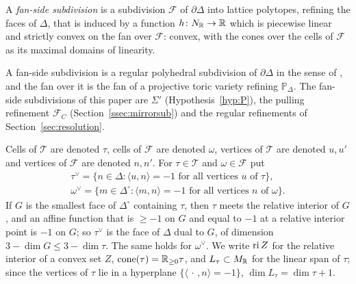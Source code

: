 \begin{definition}\label{def:fanside}
A \emph{fan-side subdivision} is a subdivision $\mathcal F$ of $\partial\Delta$ into lattice polytopes, refining the faces of
$\Delta$, that is induced by a function $h\colon N_\mathbb R\to\mathbb R$ which is piecewise linear and strictly convex on the fan over
$\mathcal F$: convex, with the cones over the cells of $\mathcal F$ as its maximal domains of linearity.
\end{definition}

A fan-side subdivision is a regular polyhedral subdivision of $\partial\Delta$ in the sense of \cite[\S2.3]{DLRS}, and the fan over it
is the fan of a projective toric variety refining $\mathbb P_\Delta$. The fan-side subdivisions of this paper are $\Sigma'$
(Hypothesis~\ref{hyp:P}), the pulling refinement $\mathcal F_C$ (Section~\ref{ssec:mirrorsub}) and the regular
refinements of Section~\ref{sec:resolution}.

Cells of $\mathcal T$ are denoted $\tau$, cells of $\mathcal F$ are denoted $\omega$, vertices of $\mathcal T$ are denoted
$u,u'$ and vertices of $\mathcal F$ are denoted $n,n'$. For $\tau\in\mathcal T$ and $\omega\in\mathcal F$ put
\begin{gather*}
\tau^\vee=\{n\in\Delta:\langle u,n\rangle=-1\text{ for all vertices $u$ of $\tau$}\},\\
\omega^\vee=\{m\in\Delta^\circ:\langle m,n\rangle=-1\text{ for all vertices $n$ of $\omega$}\}.
\end{gather*}
If $G$ is the smallest face of $\Delta^\circ$ containing $\tau$, then $\tau$ meets the relative interior of $G$, and an
affine function that is $\ge-1$ on $G$ and equal to $-1$ at a relative interior point is $-1$ on $G$; so $\tau^\vee$ is
the face of $\Delta$ dual to $G$, of dimension $3-\dim G\le3-\dim\tau$. The same holds for $\omega^\vee$. We write
$\operatorname{ri} Z$ for the relative interior of a convex set $Z$, $\operatorname{cone}(\tau)=\mathbb R_{\ge0}\tau$, and $L_\tau\subset M_\mathbb R$
for the linear span of $\tau$; since the vertices of $\tau$ lie in a hyperplane $\{\langle\,\cdot\,,n\rangle=-1\}$,
$\dim L_\tau=\dim\tau+1$.

